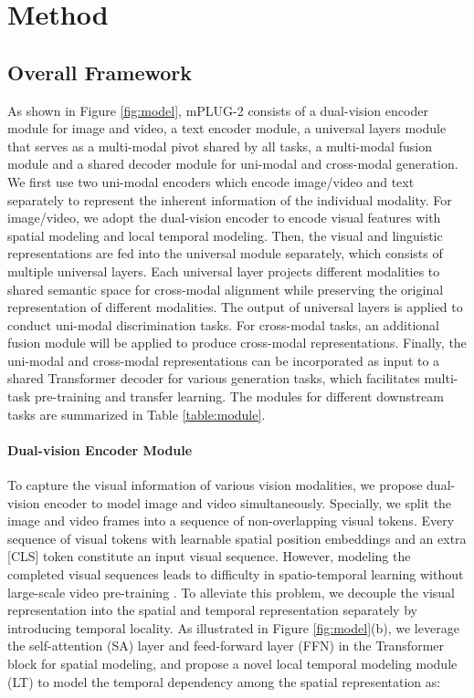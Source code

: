 \documentclass{article}
\theoremstyle{plain}
\theoremstyle{definition}
\theoremstyle{remark}
\newcommand{\modelname}{mPLUG-2 }
\begin{document}
\vspace{-3ex}
\section{Method}
\vspace{-1ex}
\subsection{Overall Framework}
As shown in Figure \ref{fig:model}, \modelname consists of a dual-vision encoder module for image and video, a text encoder module, a universal layers module that serves as a multi-modal pivot shared by all tasks, a multi-modal fusion module and a shared decoder module for uni-modal and cross-modal generation. We first use two uni-modal encoders which encode image/video and text separately to represent the inherent information of the individual modality. For image/video, we adopt the dual-vision encoder to encode visual features with spatial modeling and local temporal modeling. Then, the visual and linguistic representations are fed into the universal module separately, which consists of multiple universal layers. Each universal layer projects different modalities to shared semantic space for cross-modal alignment while preserving the original representation of different modalities. The output of universal layers is applied to conduct uni-modal discrimination tasks. For cross-modal tasks, an additional fusion module will be applied to produce cross-modal representations. Finally, the uni-modal and cross-modal representations can be incorporated as input to a shared Transformer decoder for various generation tasks, which facilitates multi-task pre-training and transfer learning. The modules for different downstream tasks are summarized in Table \ref{table:module}.

\vspace{-2ex}
\paragraph{Dual-vision Encoder Module}


To capture the visual information of various vision modalities, we propose dual-vision encoder to model image and video simultaneously. Specially, we split the image and video frames into a sequence of  non-overlapping visual tokens. Every sequence of visual tokens with learnable spatial position embeddings and an extra [CLS] token constitute an input visual sequence.
However, modeling the completed visual sequences 
leads to difficulty in spatio-temporal learning without large-scale video pre-training \citep{li2022lavender, wang2022allinone, Wang2022OmniVLOF}. To alleviate this problem, we decouple the visual representation into the spatial and temporal representation separately by introducing temporal locality.
As illustrated in Figure \ref{fig:model}(b), we leverage the self-attention (SA) layer and feed-forward layer (FFN) in the Transformer block for spatial modeling, and propose a novel local temporal modeling module (LT) to model the temporal dependency among the spatial representation as:
\end{document}
